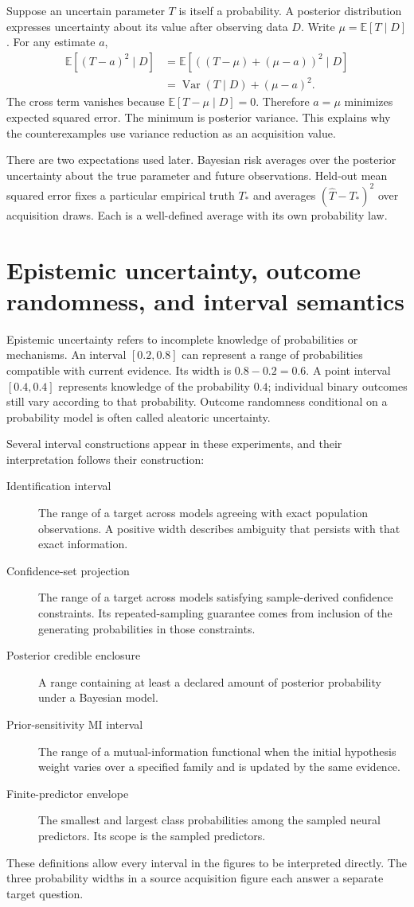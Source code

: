 \documentclass[11pt,a4paper]{report}
\newcommand{\E}{\mathbb E}
\newcommand{\Var}{\operatorname{Var}}
\begin{document}
Suppose an uncertain parameter $T$ is itself a probability. A posterior distribution expresses uncertainty about its value after observing data $D$. Write $\mu=\E[T\mid D]$. For any estimate $a$,
\begin{align}
\E[(T-a)^2\mid D]
&=\E[((T-\mu)+(\mu-a))^2\mid D]\\
&=\Var(T\mid D)+(\mu-a)^2.
\label{eq:risk}
\end{align}
The cross term vanishes because $\E[T-\mu\mid D]=0$. Therefore $a=\mu$ minimizes expected squared error. The minimum is posterior variance. This explains why the counterexamples use variance reduction as an acquisition value.

There are two expectations used later. Bayesian risk averages over the posterior uncertainty about the true parameter and future observations. Held-out mean squared error fixes a particular empirical truth $T_*$ and averages $(\widehat T-T_*)^2$ over acquisition draws. Each is a well-defined average with its own probability law.

\section{Epistemic uncertainty, outcome randomness, and interval semantics}
Epistemic uncertainty refers to incomplete knowledge of probabilities or mechanisms. An interval $[0.2,0.8]$ can represent a range of probabilities compatible with current evidence. Its width is $0.8-0.2=0.6$. A point interval $[0.4,0.4]$ represents knowledge of the probability $0.4$; individual binary outcomes still vary according to that probability. Outcome randomness conditional on a probability model is often called aleatoric uncertainty.

Several interval constructions appear in these experiments, and their interpretation follows their construction:
\begin{description}
\item[Identification interval] The range of a target across models agreeing with exact population observations. A positive width describes ambiguity that persists with that exact information.
\item[Confidence-set projection] The range of a target across models satisfying sample-derived confidence constraints. Its repeated-sampling guarantee comes from inclusion of the generating probabilities in those constraints.
\item[Posterior credible enclosure] A range containing at least a declared amount of posterior probability under a Bayesian model.
\item[Prior-sensitivity MI interval] The range of a mutual-information functional when the initial hypothesis weight varies over a specified family and is updated by the same evidence.
\item[Finite-predictor envelope] The smallest and largest class probabilities among the sampled neural predictors. Its scope is the sampled predictors.
\end{description}
These definitions allow every interval in the figures to be interpreted directly. The three probability widths in a source acquisition figure each answer a separate target question.
\end{document}
